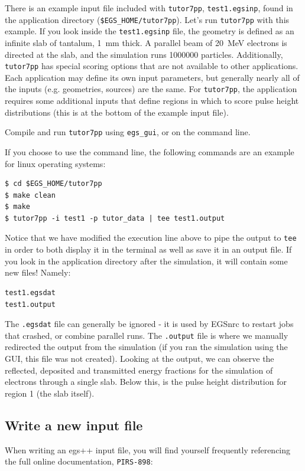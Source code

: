 \documentclass[12pt,twoside]{article}
\begin{document}
There is an example input file included with \Verb+tutor7pp+, \Verb+test1.egsinp+, found in the application directory (\Verb+$EGS_HOME/tutor7pp+). Let's run \Verb+tutor7pp+ with this example. If you look inside the \Verb+test1.egsinp+ file, the geometry is defined as an infinite slab of tantalum, 1~mm thick. A parallel beam of 20~MeV electrons is directed at the slab, and the simulation runs 1000000 particles. Additionally, \Verb+tutor7pp+ has special scoring options that are not available to other applications. Each application may define its own input parameters, but generally nearly all of the inputs (e.g. geometries, sources) are the same. For \Verb+tutor7pp+, the application requires some additional inputs that define regions in which to score pulse height distributions (this is at the bottom of the example input file).

Compile and run \Verb+tutor7pp+ using \Verb+egs_gui+, or on the command line.

If you choose to use the command line, the following commands are an example for linux operating systems:
\begin{lstlisting}
$ cd $EGS_HOME/tutor7pp
$ make clean
$ make
$ tutor7pp -i test1 -p tutor_data | tee test1.output
\end{lstlisting}

Notice that we have modified the execution line above to pipe the output to \Verb+tee+ in order to both display it in the terminal as well as save it in an output file. If you look in the application directory after the simulation, it will contain some new files! Namely:
\begin{lstlisting}[backgroundcolor=\color{white}]
test1.egsdat
test1.output
\end{lstlisting}

The \Verb+.egsdat+ file can generally be ignored - it is used by EGSnrc to restart jobs that crashed, or combine parallel runs. The \Verb+.output+ file is where we manually redirected the output from the simulation (if you ran the simulation using the GUI, this file was not created). Looking at the output, we can observe the reflected, deposited and transmitted energy fractions for the simulation of electrons through a single slab. Below this, is the pulse height distribution for region 1 (the slab itself).

\subsection{Write a new input file}
When writing an egs++ input file, you will find yourself frequently referencing the full online documentation, \Verb+PIRS-898+:
\end{document}

